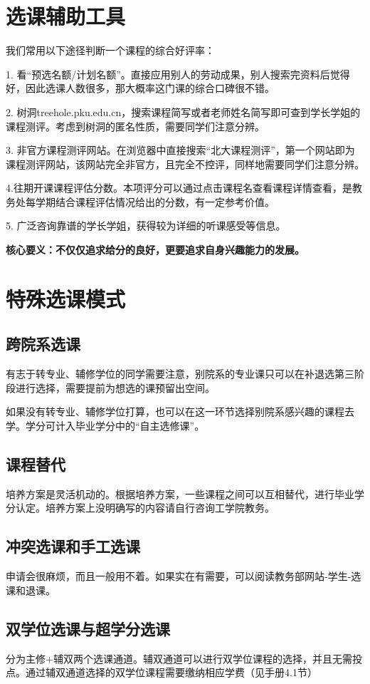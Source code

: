 \documentclass[11pt,oneside]{book}
\begin{document}
\section{选课辅助工具}
我们常用以下途径判断一个课程的综合好评率：

1. 看“预选名额/计划名额”。直接应用别人的劳动成果，别人搜索完资料后觉得好，因此选课人数很多，那大概率这门课的综合口碑很不错。

2. 树洞treehole.pku.edu.cn，搜索课程简写或者老师姓名简写即可查到学长学姐的课程测评。考虑到树洞的匿名性质，需要同学们注意分辨。

3. 非官方课程测评网站。在浏览器中直接搜索“北大课程测评”，第一个网站即为课程测评网站，该网站完全非官方，且完全不控评，同样地需要同学们注意分辨。

4.往期开课课程评估分数。本项评分可以通过点击课程名查看课程详情查看，是教务处每学期结合课程评估情况给出的分数，有一定参考价值。

5. 广泛咨询靠谱的学长学姐，获得较为详细的听课感受等信息。

\textbf{核心要义：不仅仅追求给分的良好，更要追求自身兴趣能力的发展。}

\section{特殊选课模式}
\subsection{跨院系选课}
有志于转专业、辅修学位的同学需要注意，别院系的专业课只可以在补退选第三阶段进行选择，需要提前为想选的课预留出空间。

如果没有转专业、辅修学位打算，也可以在这一环节选择别院系感兴趣的课程去学。学分可计入毕业学分中的“自主选修课”。

\subsection{课程替代}
培养方案是灵活机动的。根据培养方案，一些课程之间可以互相替代，进行毕业学分认定。培养方案上没明确写的内容请自行咨询工学院教务。

\subsection{冲突选课和手工选课}
申请会很麻烦，而且一般用不着。如果实在有需要，可以阅读教务部网站-学生-选课和退课。

\subsection{双学位选课与超学分选课}
分为主修+辅双两个选课通道。辅双通道可以进行双学位课程的选择，并且无需投点。通过辅双通道选择的双学位课程需要缴纳相应学费（见手册4.1节）
\end{document}
